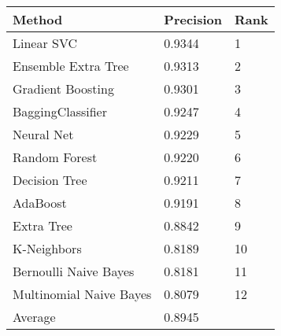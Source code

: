 \begin{tabular}{|l|l|l| }
\hline
Method                  & Precision & Rank \\ \hline
Linear SVC              & 0.9344 & 1\\
Ensemble Extra Tree     & 0.9313 & 2\\
Gradient Boosting       & 0.9301 & 3\\
BaggingClassifier       & 0.9247 & 4\\
Neural Net              & 0.9229 & 5\\
Random Forest           & 0.9220 & 6\\
Decision Tree           & 0.9211 & 7\\
AdaBoost                & 0.9191 & 8\\
Extra Tree              & 0.8842 & 9\\
K-Neighbors             & 0.8189 & 10\\
Bernoulli Naive Bayes   & 0.8181 & 11\\
Multinomial Naive Bayes & 0.8079 & 12\\
Average & 0.8945 & \\
\hline
\end{tabular}